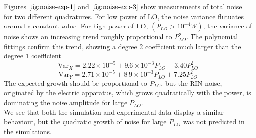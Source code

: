 %
Figures $\ref{fig:noise-exp-1}$ and $\ref{fig:noise-exp-3}$ show measurements of total noise for two different quadratures. For low power of LO, the noise variance flutuates around a constant value. For high power of LO, $(P_{LO}>10^{-4}W)$, the variance of noise shows an increasing trend roughly proportional to $P_{LO}^2$. The polynomial fittings confirm this trend, showing a degree 2 coefficient much larger than the degree 1 coefficient
%
\begin{equation}
\textrm{Var}_X = 2.22 \!\! \times \!\! 10^{-5} + 9.6 \!\! \times \!\! 10^{-3} P_{LO} + 3.40 P_{LO}^2
\end{equation}
\begin{equation}
\textrm{Var}_Y = 2.71 \!\! \times \!\! 10^{-5} + 8.9 \!\! \times \!\! 10^{-3} P_{LO} + 7.25 P_{LO}^2
\end{equation}
%
The expected growth should be proportional to $P_{LO}$, but the RIN noise, originated by the electric apparatus, which grows quadratically with the power, is dominating the noise amplitude for large $P_{LO}$.\\
We see that both the simulation and experimental data display a similar behaviour, but the quadratic growth of noise for large $P_{LO}$ was not predicted in the simulations.\\ 
